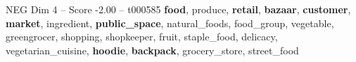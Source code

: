 \begin{textsample}{NEG Dim 4 – Score -2.00 – t000585}  \label{ex:f4_neg_007}
\textbf{food}, produce, \textbf{retail}, \textbf{bazaar}, \textbf{customer}, \textbf{market}, ingredient, \textbf{public\_space}, natural\_foods, food\_group, vegetable, greengrocer, shopping, shopkeeper, fruit, staple\_food, delicacy, vegetarian\_cuisine, \textbf{hoodie}, \textbf{backpack}, grocery\_store, street\_food

\end{textsample}
